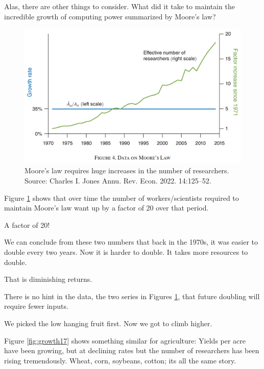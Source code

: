\documentclass[
]{book}
\begin{document}
Alas, there are other things to consider. What did it take to maintain the incredible growth of computing power summarized by Moore's law?

\begin{figure}

{\centering \includegraphics[width=1\linewidth]{img/growth/moore16} 

}

\caption{Moore’s law requires huge increases in the number of researchers. Source: Charles I. Jones Annu. Rev. Econ. 2022. 14:125–52.}\label{fig:growth16}
\end{figure}

Figure \ref{fig:growth16} shows that over time the number of workers/scientists required to maintain Moore's law want up by a factor of 20 over that period.

A factor of 20!

We can conclude from these two numbers that back in the 1970s, it was easier to double every two years. Now it is harder to double. It takes more resources to double.

That is diminishing returns.

There is no hint in the data, the two series in Figures \ref{fig:growth16}, that future doubling will require fewer inputs.

We picked the low hanging fruit first. Now we got to climb higher.

Figure \ref{fig:growth17} shows something similar for agriculture: Yields per acre have been growing, but at declining rates but the number of researchers has been rising tremendously. Wheat, corn, soybeans, cotton; its all the same story.
\end{document}
